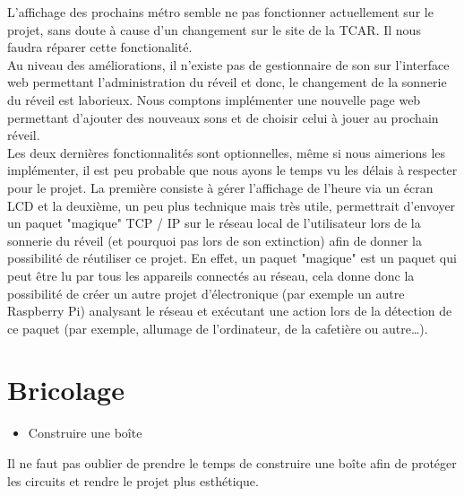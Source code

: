 \documentclass[a4paper, 12pt, french]{article}
\begin{document}
L'affichage des prochains métro semble ne pas fonctionner actuellement sur le projet, sans doute à cause d'un changement sur le site de la TCAR. Il nous faudra réparer cette fonctionalité. \\

Au niveau des améliorations, il n'existe pas de gestionnaire de son sur l'interface web permettant l'administration du réveil et donc, le changement de la sonnerie du réveil est laborieux. Nous comptons implémenter une nouvelle page web permettant d'ajouter des nouveaux sons et de choisir celui à jouer au prochain réveil. \\

Les deux dernières fonctionnalités sont optionnelles, même si nous aimerions les implémenter, il est peu probable que nous ayons le temps vu les délais à respecter pour le projet. La première consiste à gérer l'affichage de l'heure via un écran LCD et la deuxième, un peu plus technique mais très utile, permettrait d'envoyer un paquet "magique" TCP / IP sur le réseau local de l'utilisateur lors de la sonnerie du réveil (et pourquoi pas lors de son extinction) afin de donner la possibilité de réutiliser ce projet. En effet, un paquet "magique" est un paquet qui peut être lu par tous les appareils connectés au réseau, cela donne donc la possibilité de créer un autre projet d'électronique (par exemple un autre Raspberry Pi) analysant le réseau et exécutant une action lors de la détection de ce paquet (par exemple, allumage de l'ordinateur, de la cafetière ou autre\dots). \\


\section{Bricolage} %
\label{sec:bricolage}

\begin{itemize}
	\item Construire une boîte 
\end{itemize}
\vspace{20px}

Il ne faut pas oublier de prendre le temps de construire une boîte afin de protéger les circuits et rendre le projet plus esthétique. \\

\end{document}
